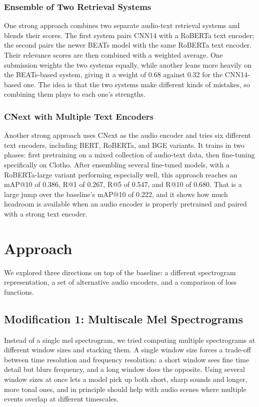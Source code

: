 \documentclass[11pt]{article}
\begin{document}
\subsubsection{Ensemble of Two Retrieval Systems}

One strong approach combines two separate audio-text retrieval systems and blends their scores.
The first system pairs CNN14 with a RoBERTa text encoder; the second pairs the newer BEATs model
with the same RoBERTa text encoder. Their relevance scores are then combined with a weighted
average. One submission weights the two systems equally, while another leans more heavily on the
BEATs-based system, giving it a weight of 0.68 against 0.32 for the CNN14-based one. The idea is
that the two systems make different kinds of mistakes, so combining them plays to each one's
strengths.

\subsubsection{CNext with Multiple Text Encoders}

Another strong approach uses CNext as the audio encoder and tries six different text encoders,
including BERT, RoBERTa, and BGE variants. It trains in two phases: first pretraining on a mixed
collection of audio-text data, then fine-tuning specifically on Clotho. After ensembling several
fine-tuned models, with a RoBERTa-large variant performing especially well, this approach reaches
an mAP@10 of 0.386, R@1 of 0.267, R@5 of 0.547, and R@10 of 0.680. That is a large jump over the
baseline's mAP@10 of 0.222, and it shows how much headroom is available when an audio encoder is
properly pretrained and paired with a strong text encoder.

\section{Approach}

We explored three directions on top of the baseline: a different spectrogram representation, a set
of alternative audio encoders, and a comparison of loss functions.

\subsection{Modification 1: Multiscale Mel Spectrograms}

Instead of a single mel spectrogram, we tried computing multiple spectrograms at different window
sizes and stacking them. A single window size forces a trade-off between time resolution and
frequency resolution: a short window sees fine time detail but blurs frequency, and a long window
does the opposite. Using several window sizes at once lets a model pick up both short, sharp sounds
and longer, more tonal ones, and in principle should help with audio scenes where multiple events
overlap at different timescales.
\end{document}
